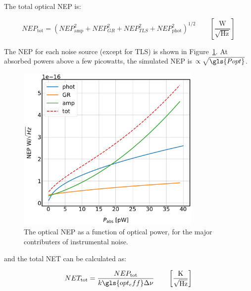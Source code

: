 The total optical NEP is:

\begin{equation} \label{eq:NEP tot}
  NEP_{\mathrm{tot}} = \left( NEP_{\mathrm{amp}}^{2} + NEP_{GR}^{2} + NEP_{TLS}^{2} + NEP_{\mathrm{phot}}^{2} \right)^{1/2} \qquad \left[ \frac{\mathrm{W}}{\sqrt{\mathrm{Hz}}} \right]
\end{equation}

The NEP for each noise source (except for TLS) is shown in Figure~\ref{fig:NEP_tot}. At absorbed powers above a few picowatts, the simulated NEP is $\propto \sqrt{\gls{Popt}}$.

\begin{figure}[!htbp]
\centering
\includegraphics[width=0.8\textwidth]{figures/kid_model/NEP}
\caption[~The optical NEP as a function of optical power, for the major contributers of instrumental noise.]{The optical NEP as a function of optical power, for the major contributers of instrumental noise.}
\label{fig:NEP_tot}
\end{figure}

and the total NET can be calculated as:

\begin{equation} \label{eq:NET tot}
  NET_{\mathrm{tot}} = \frac{NEP_{\mathrm{tot}}}{k\gls{opt_eff}\Delta\nu} \qquad \left[ \frac{\mathrm{K}}{\sqrt{\mathrm{Hz}}} \right]
\end{equation}


